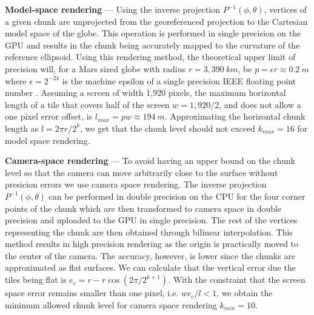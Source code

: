 \documentclass[journal]{vgtc}                %
\newcommand{\alexcomment}[1]{\textbf{[-Alex-~}
    \textcolor{magenta}{#1}
    \textbf{~]}}
\newcommand{\plgrem}[1]{\textcolor{blue}{~\textbf{!!}~}}
\begin{document}





\noindent\textbf{Model-space rendering} ---
Using the inverse projection $P^{-1}(\phi,\theta)$, vertices of a given chunk are unprojected from the georeferenced projection to the Cartesian model space of the globe.
This operation is performed in single precision on the GPU and results in the chunk being accurately mapped to the curvature of the reference ellipsoid.
Using this rendering method, the theoretical upper limit of precision will, for a Mars sized globe with radius $r = 3,390 ~km$, be $p = \epsilon r \approx 0.2 ~m$ where $\epsilon = 2^{-24}$ is the machine epsilon of a single precision IEEE floating point number \cite{Axelsson2017Dynamic}. Assuming a screen of width 1,920 pixels, the maximum horizontal length of a tile that covers half of the screen $w = 1,920 / 2$, and does not allow a one pixel error offset, is $l_{max} = p w \approx 194~m$. Approximating the horizontal chunk length as $l = 2 \pi r / 2^{k}$, we get that the chunk level should not exceed $k_{max} = 16$ for model space rendering.

\noindent\textbf{Camera-space rendering} ---
To avoid having an upper bound on the chunk level so that the camera can move arbitrarily close to the surface without presicion errors we use camera space rendering.
The inverse projection $P^{-1}(\phi,\theta)$ can be performed in double precision on the CPU for the four corner points of the chunk which are then transformed to camera space in double precision and uploaded to the GPU in single precision.
The rest of the vertices representing the chunk are then obtained through bilinear interpolation.
This method results in high precision rendering as the origin is practically moved to the center of the camera.
The accuracy, however, is lower since the chunks are approximated as flat surfaces.
We can calculate that the vertical error due the tiles being flat is $e_c = r - r \cos{(2\pi/2^{k + 1})}$.
With the constraint that the screen space error remains smaller than one pixel, i.e. $w e_c / l < 1$, we obtain the minimum allowed chunk level for camera space rendering $k_{min} = 10$.
\end{document}
